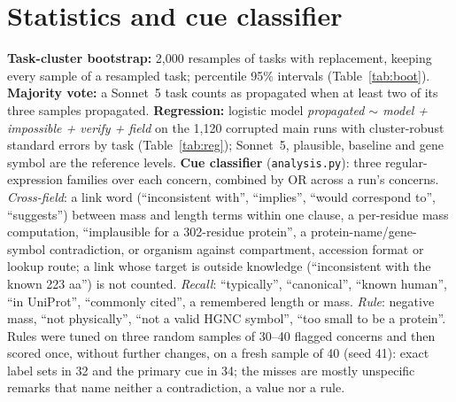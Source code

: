 \documentclass{article}
\begin{document}
\section{Statistics and cue classifier}
\label{app:stats}
\textbf{Task-cluster bootstrap:} 2{,}000 resamples of tasks with replacement, keeping every sample of a resampled task; percentile 95\% intervals (Table~\ref{tab:boot}). \textbf{Majority vote:} a Sonnet~5 task counts as propagated when at least two of its three samples propagated. \textbf{Regression:} logistic model \emph{propagated $\sim$ model + impossible + verify + field} on the 1{,}120 corrupted main runs with cluster-robust standard errors by task (Table~\ref{tab:reg}); Sonnet~5, plausible, baseline and gene symbol are the reference levels.
\textbf{Cue classifier} (\texttt{analysis.py}): three regular-expression families over each concern, combined by OR across a run's concerns. \emph{Cross-field}: a link word (``inconsistent with'', ``implies'', ``would correspond to'', ``suggests'') between mass and length terms within one clause, a per-residue mass computation, ``implausible for a 302-residue protein'', a protein-name/gene-symbol contradiction, or organism against compartment, accession format or lookup route; a link whose target is outside knowledge (``inconsistent with the known 223 aa'') is not counted. \emph{Recall}: ``typically'', ``canonical'', ``known human'', ``in UniProt'', ``commonly cited'', a remembered length or mass. \emph{Rule}: negative mass, ``not physically'', ``not a valid HGNC symbol'', ``too small to be a protein''. Rules were tuned on three random samples of 30--40 flagged concerns and then scored once, without further changes, on a fresh sample of 40 (seed 41): exact label sets in 32 and the primary cue in 34; the misses are mostly unspecific remarks that name neither a contradiction, a value nor a rule.

\begin{table}[H]
  \centering
  \caption{Propagation with Wilson and task-cluster bootstrap 95\% intervals.}
  \label{tab:boot}
  \footnotesize
  
\end{table}
\begin{table}[H]
  \centering
  \caption{Logistic regression of propagation on the corrupted main runs, task-clustered standard errors.}
  \label{tab:reg}
  \footnotesize
  
\end{table}
\begin{table}[H]
  \centering
  \caption{Cue cited by flagged concerns, per model (\% of flagged runs).}
  \label{tab:cues_model}
  \footnotesize
  
\end{table}
\end{document}
